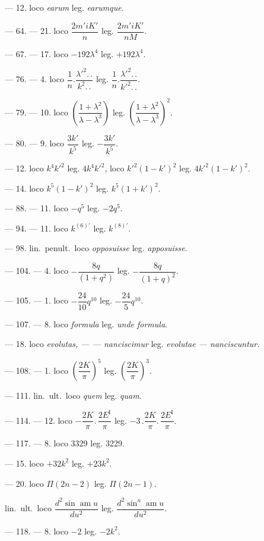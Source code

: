 \documentclass{article}
\begin{document}
--- 12. loco \emph{earum} leg. \emph{earumque}.

--- 64. --- 21. loco $\dfrac{2m'iK'}{n}$ leg. $\dfrac{2m'iK'}{nM}$.

--- 67. --- 17. loco $-192\lambda^{4}$ leg. $+192\lambda^{4}$.

--- 76. --- 4. loco $\dfrac{1}{n}.\dfrac{\lambda'^{2}.\,.}{k^{2}.\,.}$ leg. $\dfrac{1}{n}.\dfrac{\lambda'^{2}.\,.}{k'^{2}.\,.}$.

--- 79. --- 10. loco $\left(\dfrac{1+\lambda^{2}}{\lambda-\lambda^{3}}\right)$ leg. $\left(\dfrac{1+\lambda^{2}}{\lambda-\lambda^{3}}\right)^{2}$.

--- 80. --- 9. loco $\dfrac{3k'}{k^{5}}$ leg. $-\dfrac{3k'}{k^{5}}$.

--- 12. loco $k^{4}k'^{2}$ leg. $4k^{4}k'^{2}$, loco $k'^{2}(1-k')^{2}$ leg. $4k'^{2}(1-k')^{2}$.

--- 14. loco $k^{5}(1-k')^{2}$ leg. $k^{5}(1+k')^{2}$.

--- 88. --- 11. loco $-q^{5}$ leg. $-2q^{5}$.

--- 94. --- 11. loco $k^{(6)\prime}$ leg. $k^{(8)\prime}$.

--- 98. lin.\ penult.\ loco \emph{opposuisse} leg. \emph{apposuisse}.

--- 104. --- 4. loco $-\dfrac{8q}{(1+q^{2})}$ leg. $-\dfrac{8q}{(1+q)^{2}}$.

--- 105. --- 1. loco $-\dfrac{24}{10}q^{10}$ leg. $-\dfrac{24}{5}q^{10}$.

--- 107. --- 8. loco \emph{formula} leg. \emph{unde formula}.

--- 18. loco \emph{evolutas, --- --- nanciscimur} leg. \emph{evolutae --- nanciscuntur.}

--- 108. --- 1. loco $\left(\dfrac{2K}{\pi}\right)^{5}$ leg. $\left(\dfrac{2K}{\pi}\right)^{3}$.

--- 111. lin.\ ult.\ loco \emph{quem} leg. \emph{quam}.

--- 114. --- 12. loco $-\dfrac{2K}{\pi}.\,\dfrac{2E^{\mathrm{I}}}{\pi}$ leg. $-3\,.\dfrac{2K}{\pi}.\,\dfrac{2E^{\mathrm{I}}}{\pi}$.

--- 117. --- 8. loco 3329 leg. 3229.

--- 15. loco $+32k^{2}$ leg. $+23k^{2}$.

--- 20. loco $\Pi(2n-2)$ leg. $\Pi(2n-1)$.

lin.\ ult.\ loco $\dfrac{d^{2}\sin\operatorname{am}u}{du^{2}}$ leg. $\dfrac{d^{2}\sin^{n}\operatorname{am}u}{du^{2}}$.

--- 118. --- 8. loco $-2$ leg. $-2k^{2}$.
\end{document}
